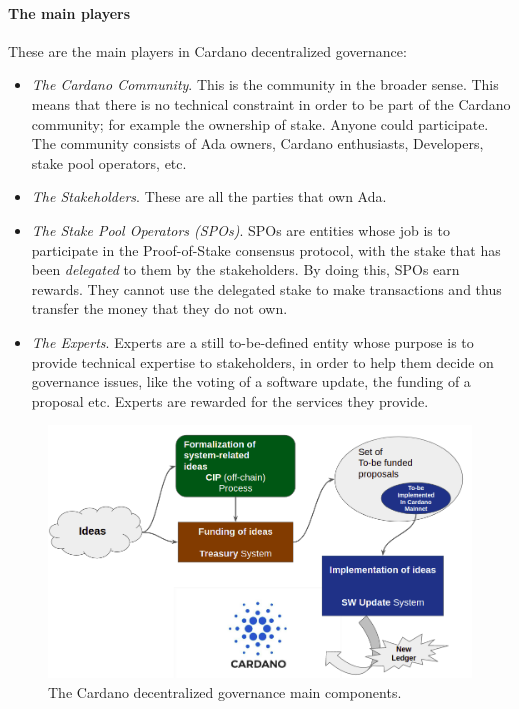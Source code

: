 \paragraph{The main players}
These are the main players in Cardano decentralized governance:
\begin{itemize}
	\item \emph{The Cardano Community}. This is the community in the broader 
	sense. This means that there is no technical constraint in order to be part 
	of the Cardano community; for example the ownership of stake. Anyone could 
	participate. The community consists of Ada owners, Cardano enthusiasts, 
	Developers, stake pool operators, etc.
	\item \emph{The Stakeholders}. These are all the parties that own Ada.	
	\item \emph{The Stake Pool Operators (SPOs)}. SPOs are entities whose job 
	is to participate in the Proof-of-Stake consensus protocol, with the stake 
	that has been 
	\emph{delegated} to them by the 
	stakeholders. By doing this, SPOs earn rewards. They 
	cannot use the delegated stake to make transactions and thus 
	transfer the 
	money that they do not own.
	\item \emph{The Experts}. Experts are a still to-be-defined entity whose 
	purpose is to provide technical expertise to stakeholders, in order to help 
	them decide on governance issues, like the voting of a software update, the 
	funding of a proposal etc. Experts are rewarded for the services they 
	provide.	
\end{itemize}

\begin{figure}[h!] %
	\centering
	\includegraphics[width=0.8\columnwidth,
	keepaspectratio]{figures/cardano_dec_gov_components.png}
	\caption{The Cardano decentralized governance main components.}
	\label{fig:cardano_dec_gov_components}
\end{figure}


